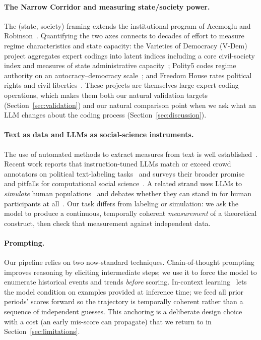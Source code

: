 \documentclass[twocolumn,10pt]{article}
\begin{document}
\paragraph{The Narrow Corridor and measuring state/society power.}
The (state, society) framing extends the institutional program of Acemoglu and
Robinson~\citep{acemoglu2012why,acemoglu2019narrow}. Quantifying the two axes
connects to decades of effort to measure regime characteristics and state
capacity: the Varieties of Democracy (V-Dem) project aggregates expert codings
into latent indices including a core civil-society index and measures of state
administrative capacity~\citep{coppedge2024vdem,pemstein2018vdem}; Polity5 codes
regime authority on an autocracy--democracy scale~\citep{marshall2020polity};
and Freedom House rates political rights and civil
liberties~\citep{freedomhouse2023}. These projects are themselves large expert
coding operations, which makes them both our natural validation targets
(Section~\ref{sec:validation}) and our natural comparison point when we ask what
an LLM changes about the coding process (Section~\ref{sec:discussion}).

\paragraph{Text as data and LLMs as social-science instruments.}
The use of automated methods to extract measures from text is
well established~\citep{grimmer2013text}. Recent work reports that instruction-tuned
LLMs match or exceed crowd annotators on political text-labeling
tasks~\citep{gilardi2023chatgpt} and surveys their broader promise and pitfalls
for computational social science~\citep{ziems2024can}. A related strand uses LLMs
to \emph{simulate} human populations~\citep{argyle2023out} and debates whether
they can stand in for human participants at
all~\citep{dillion2023can}. Our task differs from labeling or simulation: we ask
the model to produce a continuous, temporally coherent \emph{measurement} of a
theoretical construct, then check that measurement against independent data.

\paragraph{Prompting.}
Our pipeline relies on two now-standard techniques. Chain-of-thought
prompting~\citep{wei2022chain} improves reasoning by eliciting intermediate
steps; we use it to force the model to enumerate historical events and trends
\emph{before} scoring. In-context learning~\citep{brown2020language,dong2024survey}
lets the model condition on examples provided at inference time; we feed all
prior periods' scores forward so the trajectory is temporally coherent rather
than a sequence of independent guesses. This anchoring is a deliberate design
choice with a cost (an early mis-score can propagate) that we return to in
Section~\ref{sec:limitations}.
\end{document}
